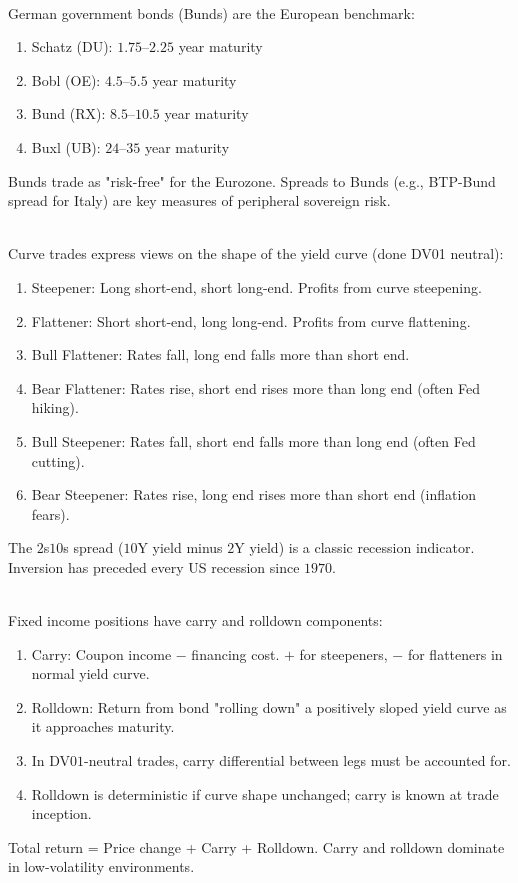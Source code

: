\documentclass[a4paper,oneside,openany]{book}
\begin{document}
\begin{remark} \\
German government bonds (Bunds) are the European benchmark:
\begin{enumerate}[label=\roman*.]
\setlength{\itemsep}{0pt}
\item Schatz (DU): $1.75$--$2.25$ year maturity
\item Bobl (OE): $4.5$--$5.5$ year maturity
\item Bund (RX): $8.5$--$10.5$ year maturity
\item Buxl (UB): $24$--$35$ year maturity
\end{enumerate}
Bunds trade as "risk-free" for the Eurozone. Spreads to Bunds (e.g., BTP-Bund spread for Italy) are key measures of peripheral sovereign risk.
\end{remark}

\begin{remark} \\
Curve trades express views on the shape of the yield curve (done DV01 neutral):
\begin{enumerate}[label=\roman*.]
\setlength{\itemsep}{0pt}
\item Steepener: Long short-end, short long-end. Profits from curve steepening.
\item Flattener: Short short-end, long long-end. Profits from curve flattening.
\item Bull Flattener: Rates fall, long end falls more than short end.
\item Bear Flattener: Rates rise, short end rises more than long end (often Fed hiking).
\item Bull Steepener: Rates fall, short end falls more than long end (often Fed cutting).
\item Bear Steepener: Rates rise, long end rises more than short end (inflation fears).
\end{enumerate}
The $2$s$10$s spread ($10$Y yield minus $2$Y yield) is a classic recession indicator. Inversion has preceded every US recession since $1970$.
\end{remark}

\begin{remark} \\
Fixed income positions have carry and rolldown components:
\begin{enumerate}[label=\roman*.]
\setlength{\itemsep}{0pt}
\item Carry: Coupon income $-$ financing cost. $+$ for steepeners, $-$ for flatteners in normal yield curve.
\item Rolldown: Return from bond "rolling down" a positively sloped yield curve as it approaches maturity.
\item In DV$01$-neutral trades, carry differential between legs must be accounted for.
\item Rolldown is deterministic if curve shape unchanged; carry is known at trade inception.
\end{enumerate}
Total return = Price change + Carry + Rolldown. Carry and rolldown dominate in low-volatility environments.
\end{remark}
\end{document}
